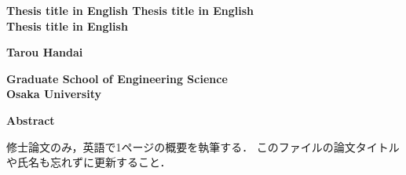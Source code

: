 \begin{center}
  \large{ \textbf{
    Thesis title in English Thesis title in English \\
    Thesis title in English
  }}
\end{center}
\begin{center}
  \large{ \textbf{
    Tarou Handai
  }}
\end{center}
\begin{center}
  \textbf{
    Graduate School of Engineering Science\\
    Osaka University
  }
\end{center}
\begin{center}
  \textbf{Abstract}
\end{center}

\begin{tcolorbox}
  修士論文のみ，英語で1ページの概要を執筆する．
  このファイルの論文タイトルや氏名も忘れずに更新すること．
\end{tcolorbox}

\lipsum[1-3]
